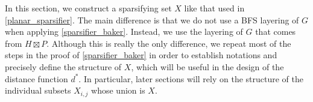 \documentclass{patmorin}
\renewcommand{\le}{\leqslant}
\newcommand{\pat}[1]{\textcolor{Blue}{Pat: #1}}
\DeclareMathOperator{\tw}{tw}
\begin{document}
In this section, we construct a sparsifying set $X$ like that used in \cref{planar_sparsifier}.  The main difference is that we do not use a BFS layering of $G$ when applying \cref{sparsifier_baker}. Instead, we use the layering of $G$ that comes from $H\boxtimes P$.  Although this is really the only difference, we repeat most of the steps in the proof of \cref{sparsifier_baker} in order to establish notations and precisely define the structure of $X$, which will be useful in the design of the distance function $d^*$.  In particular, later sections will rely on the structure of the individual subsets $X_{i,j}$ whose union is $X$.

%
%
\end{document}
